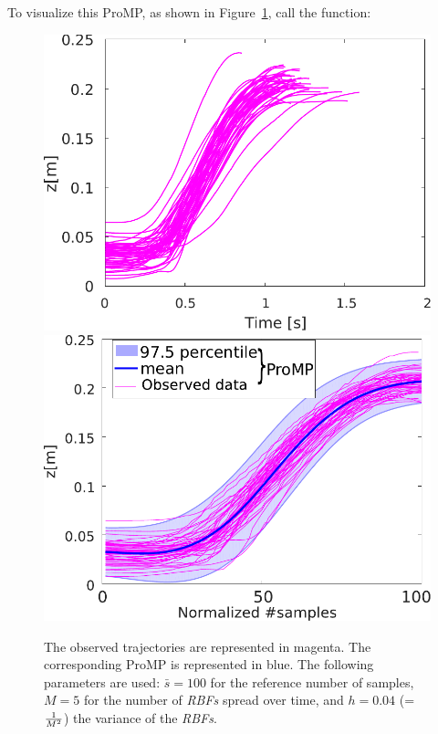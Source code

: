 \documentclass[utf8]{frontiersSCNS} %
\newcommand{\todo}[1]{\textcolor{red}{\textbf{/*#1*/}}}
\begin{document}
To visualize this ProMP, as shown in Figure~\ref{fig:1DOFtrajectoriesProMP}, call the function:



\begin{figure}[h]
\includegraphics[width=\hsize /2]{img/1DOFtrajectoriesV2.pdf} \includegraphics[width=\hsize /2]{img/1DOFtrajectoriesProMPV2.pdf}
\caption{The observed trajectories are represented in magenta. The corresponding ProMP is represented in blue. The following parameters are used: $\bar{s}=100$ for the reference number of samples, $M=5$ for the number of \textit{RBFs} spread over time, and  $h=0.04$ (=$ 1 \over M^2$) the variance of the \textit{RBFs}.}
\label{fig:1DOFtrajectoriesProMP}
\end{figure}
\end{document}
